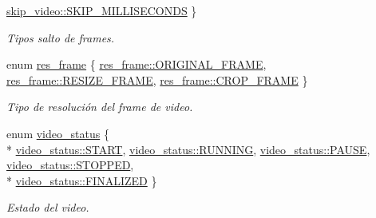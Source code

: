 \begin{DoxyCompactItemize}
\hyperlink{namespace_i3_d_abddd5dc8b13d45924d75d4dc1d6a0c9ea4e7623b023b3d356fde32b1392b30f79}{skip\+\_\+video\+::\+S\+K\+I\+P\+\_\+\+M\+I\+L\+L\+I\+S\+E\+C\+O\+N\+DS}
 \}\begin{DoxyCompactList}\small\item\em Tipos salto de frames. \end{DoxyCompactList}
\item 
enum \hyperlink{namespace_i3_d_a2952d5af44b39c5dfe7e0344e012c479}{res\+\_\+frame} \{ \hyperlink{namespace_i3_d_a2952d5af44b39c5dfe7e0344e012c479a967bb7a9639e6d248159eace3ca85eb6}{res\+\_\+frame\+::\+O\+R\+I\+G\+I\+N\+A\+L\+\_\+\+F\+R\+A\+ME}, 
\hyperlink{namespace_i3_d_a2952d5af44b39c5dfe7e0344e012c479ac7d706ac3ce91240180fad0ce2935596}{res\+\_\+frame\+::\+R\+E\+S\+I\+Z\+E\+\_\+\+F\+R\+A\+ME}, 
\hyperlink{namespace_i3_d_a2952d5af44b39c5dfe7e0344e012c479aa23263786ea4d984a19228b9e7d96e7b}{res\+\_\+frame\+::\+C\+R\+O\+P\+\_\+\+F\+R\+A\+ME}
 \}\begin{DoxyCompactList}\small\item\em Tipo de resolución del frame de video. \end{DoxyCompactList}
\item 
enum \hyperlink{namespace_i3_d_a0ce9cf7811476557a3d1be9da416cbd3}{video\+\_\+status} \{ \\*
\hyperlink{namespace_i3_d_a0ce9cf7811476557a3d1be9da416cbd3ab078ffd28db767c502ac367053f6e0ac}{video\+\_\+status\+::\+S\+T\+A\+RT}, 
\hyperlink{namespace_i3_d_a0ce9cf7811476557a3d1be9da416cbd3a43491564ebcfd38568918efbd6e840fd}{video\+\_\+status\+::\+R\+U\+N\+N\+I\+NG}, 
\hyperlink{namespace_i3_d_a0ce9cf7811476557a3d1be9da416cbd3a291554596c183e837f0a6bec3767c891}{video\+\_\+status\+::\+P\+A\+U\+SE}, 
\hyperlink{namespace_i3_d_a0ce9cf7811476557a3d1be9da416cbd3a09d4d696b4e935115b9313e3c412509a}{video\+\_\+status\+::\+S\+T\+O\+P\+P\+ED}, 
\\*
\hyperlink{namespace_i3_d_a0ce9cf7811476557a3d1be9da416cbd3a227279d022dc207ab93201dc7688680d}{video\+\_\+status\+::\+F\+I\+N\+A\+L\+I\+Z\+ED}
 \}\begin{DoxyCompactList}\small\item\em Estado del video. \end{DoxyCompactList}
\end{DoxyCompactItemize}
